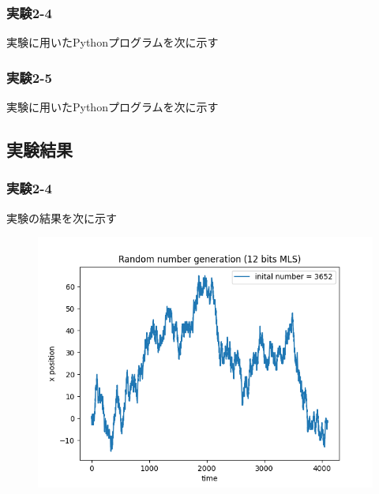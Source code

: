 \documentclass[xelatex,ja=standard]{bxjsarticle}
\begin{document}
\subsubsection{実験2-4}
実験に用いたPythonプログラムを次に示す



\subsubsection{実験2-5}
実験に用いたPythonプログラムを次に示す



\subsection{実験結果}

\subsubsection{実験2-4}
実験の結果を次に示す
\begin{figure}[htbp]
    \centering
    \includegraphics[scale=0.7]
{4.png}
    \label{fig:1}
\end{figure}
\end{document}

